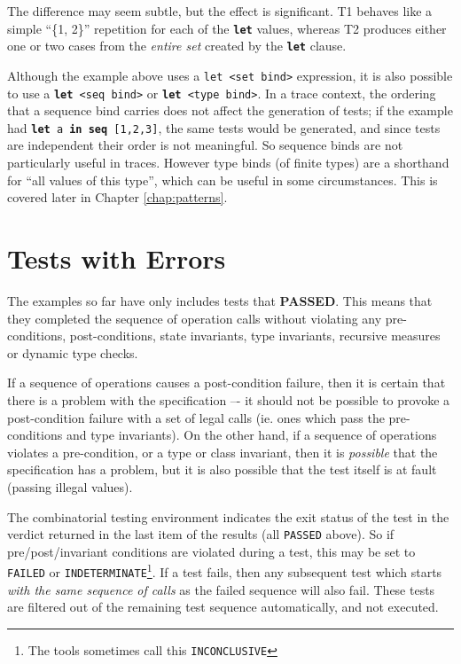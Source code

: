 \documentclass{overturerepchap}
\begin{document}
The difference may seem subtle, but the effect is significant. T1 behaves like a
simple ``\{1, 2\}'' repetition for each of the \texttt{\textbf{let}} values, whereas T2
produces either one or two cases from the \emph{entire set} created by the \texttt{\textbf{let}}
clause.

Although the example above uses a \texttt{let <set bind>} expression, it is also
possible to use a \texttt{\textbf{let} <seq bind>} or \texttt{\textbf{let} <type bind>}. In a
trace context, the ordering that a sequence bind carries does not affect the
generation of tests; if the example had \texttt{\textbf{let} a \textbf{in seq} [1,2,3]}, the
same tests would be generated, and since tests are independent their order is not
meaningful. So sequence binds are not particularly useful in traces. However
type binds (of finite types) are a shorthand for ``all values of this type'',
which can be useful in some circumstances. This is covered later in Chapter
\ref{chap:patterns}.

\section{Tests with Errors}

The examples so far have only includes tests that \textbf{PASSED}. This means that they
completed the sequence of operation calls without violating any pre-conditions,
post-conditions, state invariants, type invariants, recursive measures or dynamic
type checks.

If a sequence of operations causes a post-condition failure, then it
is certain that there is a problem with the specification –- it should not be
possible to provoke a post-condition failure with a set of legal calls (ie. ones
which pass the pre-conditions and type invariants). On the other hand, if a 
sequence of operations violates a pre-condition, or a type or class invariant, 
then it is \emph{possible} that the specification has a problem, but it is also 
possible that the test itself is at fault (passing illegal values).

The combinatorial testing environment indicates the exit status of the test  in
the verdict returned in the last item of the results (all \texttt{PASSED} above). So if 
pre/post/invariant conditions are violated during a test, this may be set to 
\texttt{FAILED} or \texttt{INDETERMINATE}\footnote{The tools sometimes call this \texttt{INCONCLUSIVE}}. If
a test fails, then any subsequent test which starts \emph{with the same
sequence of calls} as the failed sequence will also fail. These tests are
filtered out of the remaining test sequence automatically, and not executed.
\end{document}
